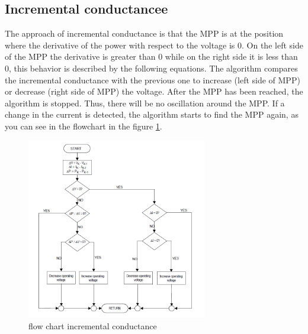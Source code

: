 \subsection{Incremental conductancee}
The approach of incremental conductance is that the MPP is at the position where the derivative of the power with respect to the voltage is 0. On the left side of the MPP the derivative is greater than 0 while on the right side it is less than 0, this behavior is described by the following equations.\newline
The algorithm compares the incremental conductance with the previous one to increase (left side of MPP) or decrease (right side of MPP) the voltage. After the MPP has been reached, the algorithm is stopped. Thus, there will be no oscillation around the MPP. If a change in the current is detected, the algorithm starts to find the MPP again, as you can see in the flowchart in the figure \ref{fcinccon}\cite{}.
\begin{figure}[H]
	\begin{center}
		\includegraphics[width=0.7\textwidth]{../Pictures/P1/Flow_chart/flow_chart_incremental_conductance}
		\caption{flow chart incremental conductance }
		\label{fcinccon}
	\end{center}	
\end{figure}


